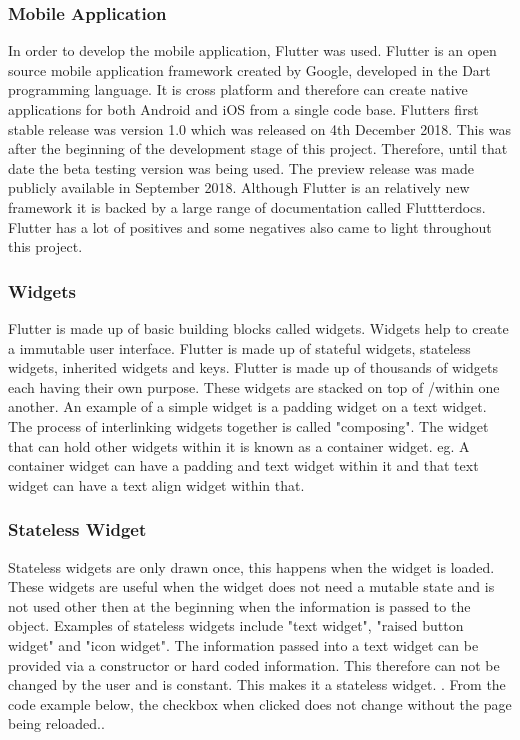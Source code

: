 \subsubsection{Mobile Application}
In order to develop the mobile application, Flutter was used. Flutter is an open source mobile application framework created by Google, developed in the Dart programming language. It is cross platform and therefore can create native applications for both Android and iOS from a single code base. Flutters first stable release was version 1.0 which was released on 4th December 2018. This was after the beginning of the development stage of this project. Therefore, until that date the beta testing version was being used. The preview release was made publicly available in September 2018. Although Flutter is an relatively new framework it is backed by a large range of documentation called Fluttterdocs. Flutter has a lot of positives and some negatives also came to light throughout this project.

\subsubsection{Widgets}
Flutter is made up of basic building blocks called widgets. Widgets help to create a immutable user interface. Flutter is made up of stateful widgets, stateless widgets, inherited widgets and keys. Flutter is made up of thousands of widgets each having their own purpose. These widgets are stacked on top of /within one another. An example of a simple widget is a padding widget on a text widget. The process of interlinking widgets together is called "composing". The widget that can hold other widgets within it is known as a container widget. eg. A container widget can have a padding and text widget within it and that text widget can have a text align widget within that.\cite{widgets}

\subsubsection{Stateless Widget}
Stateless widgets are only drawn once, this happens when the widget is loaded. These widgets are useful when the widget does not need a mutable state and is not used other then at the beginning when the information is passed to the object. Examples of stateless widgets include "text widget", "raised button widget" and "icon widget". The information passed into a text widget can be provided via a constructor or hard coded information. This therefore can not be changed by the user and is constant. This makes it a stateless widget. \cite{birch_2019}. From the code example below, the checkbox when clicked does not change without the page being reloaded.\cite{stateful_widgets_2018}.

